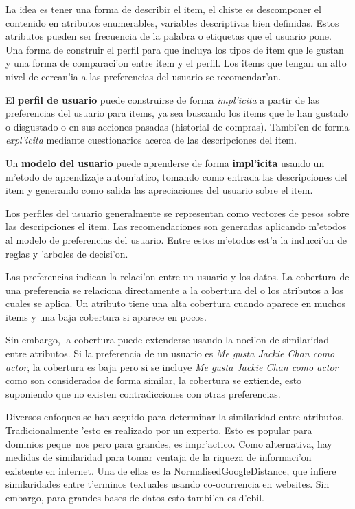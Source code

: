 \documentclass[11pt]{article}
\begin{document}
La idea es tener una forma de describir el item, el chiste es descomponer el contenido en atributos enumerables, variables descriptivas bien definidas. Estos atributos pueden ser frecuencia de la palabra o etiquetas que el usuario pone. Una forma de construir el perfil para que incluya los tipos de item que le gustan y una forma de comparaci'on entre item y el perfil. Los items que tengan un alto nivel de cercan'ia a las preferencias del usuario se recomendar'an. 

El \textbf{perfil de usuario} puede construirse de forma \textit{impl'icita} a partir de las preferencias del usuario para items, ya sea buscando los items que le han gustado o disgustado o en sus acciones pasadas (historial de compras). Tambi'en de forma \textit{expl'icita} mediante cuestionarios acerca de las descripciones del item.

Un \textbf{modelo del usuario} puede aprenderse de forma \textbf{impl'icita} usando un m'etodo de aprendizaje autom'atico, tomando como entrada las descripciones del item y generando como salida las apreciaciones del usuario sobre el item. 

Los perfiles del usuario generalmente se representan como vectores de pesos sobre las descripciones el item. Las recomendaciones son generadas aplicando m'etodos al modelo de preferencias del usuario. Entre estos m'etodos est'a la inducci'on de reglas y 'arboles de decisi'on.

Las preferencias indican la relaci'on entre un usuario y los datos. La cobertura de una preferencia se relaciona directamente a la cobertura del o los atributos a los cuales se aplica. Un atributo tiene una alta cobertura cuando aparece en muchos items y una baja cobertura si aparece en pocos. 

Sin embargo, la cobertura puede extenderse usando la noci'on de similaridad entre atributos. Si la preferencia de un usuario es \textit{Me gusta Jackie Chan como actor}, la cobertura es baja pero si se incluye \textit{Me gusta Jackie Chan como actor} como son considerados de forma similar, la cobertura se extiende, esto suponiendo que no existen contradicciones con otras preferencias.

 Diversos enfoques se han seguido para determinar la similaridad entre atributos. Tradicionalmente 'esto es realizado por un experto. Esto es popular para dominios peque~nos pero para grandes, es impr'actico. Como alternativa, hay medidas de similaridad para tomar ventaja de la riqueza de informaci'on existente en internet. Una de ellas es la NormalisedGoogleDistance, que infiere similaridades entre t'erminos textuales usando co-ocurrencia en websites. Sin embargo, para grandes bases de datos esto tambi'en es d'ebil.
\end{document}
